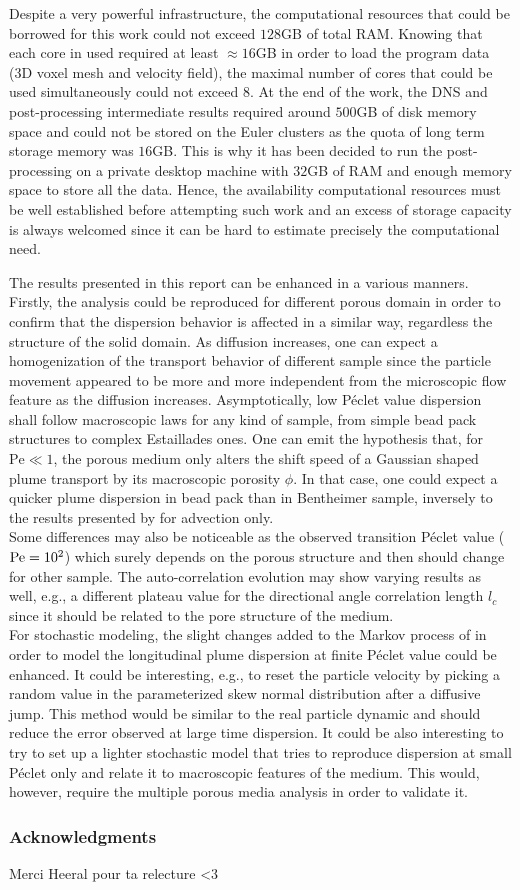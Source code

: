 Despite a very powerful infrastructure, the computational resources that could be borrowed for this work could not exceed $128$GB of total RAM. 
Knowing that each core in used required at least $\approx 16$GB in order to load the program data (3D voxel mesh and velocity field), the maximal number of cores that could be used simultaneously could not exceed 8.
At the end of the work, the DNS and post-processing intermediate results required around $500$GB of disk memory space and could not be stored on the Euler clusters as the quota of long term storage memory was $16$GB. 
This is why it has been decided to run the post-processing on a private desktop machine with $32$GB of RAM and enough memory space to store all the data.
Hence, the availability computational resources must be well established before attempting such work and an excess of storage capacity is always welcomed since it can be hard to estimate precisely the computational need.

The results presented in this report can be enhanced in a various manners.
Firstly, the analysis could be reproduced for different porous domain in order to confirm that the dispersion behavior is affected in a similar way, regardless the structure of the solid domain.
As diffusion increases, one can expect a homogenization of the transport behavior of different sample since the particle movement appeared to be more and more independent from the microscopic flow feature as the diffusion increases.
Asymptotically, low Péclet value dispersion shall follow macroscopic laws for any kind of sample, from simple bead pack structures to complex Estaillades ones.
One can emit the hypothesis that, for $\mathrm{Pe}\ll 1$, the porous medium only alters the shift speed of a Gaussian shaped plume transport by its macroscopic porosity $\phi$. 
In that case, one could expect a quicker plume dispersion in bead pack than in Bentheimer sample, inversely to the results presented by \cite{Meyer2016} for advection only.\\
Some differences may also be noticeable as the observed transition Péclet value ($\mathrm{Pe}=10^2$) which surely depends on the porous structure and then should change for other sample. 
The auto-correlation evolution may show varying results as well, e.g., a different plateau value for the directional angle correlation length $l_c$ since it should be related to the pore structure of the medium.\\
For stochastic modeling, the slight changes added to the Markov process of \citet{Meyer2016} in order to model the longitudinal plume dispersion at finite Péclet value could be enhanced.
It could be interesting, e.g., to reset the particle velocity by picking a random value in the parameterized skew normal distribution after a diffusive jump. 
This method would be similar to the real particle dynamic and should reduce the error observed at large time dispersion.
It could be also interesting to try to set up a lighter stochastic model that tries to reproduce dispersion at small Péclet only and relate it to macroscopic features of the medium.
This would, however, require the multiple porous media analysis in order to validate it.

\subsubsection{Acknowledgments}
Merci Heeral pour ta relecture <3